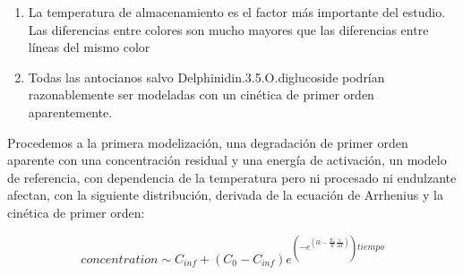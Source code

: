 \documentclass[
]{article}
\providecommand{\tightlist}{%
  \setlength{\itemsep}{0pt}\setlength{\parskip}{0pt}}
\begin{document}
\begin{enumerate}
\def\labelenumi{\arabic{enumi}.}
\tightlist
\item
  La temperatura de almacenamiento es el factor más importante del
  estudio. Las diferencias entre colores son mucho mayores que las
  diferencias entre líneas del mismo color
\item
  Todas las antocianos salvo Delphinidin.3.5.O.diglucoside podrían
  razonablemente ser modeladas con un cinética de primer orden
  aparentemente.
\end{enumerate}

Procedemos a la primera modelización, una degradación de primer orden
aparente con una concentración residual y una energía de activación, un
modelo de referencia, con dependencia de la temperatura pero ni
procesado ni endulzante afectan, con la siguiente distribución, derivada
de la ecuación de Arrhenius y la cinética de primer orden:

\[concentration \sim C_{inf}+(C_0-C_{inf})e^{(-e^{(lk-\frac{E_a}{R} \frac{1}{\Delta T})})tiempo}\]
\end{document}
